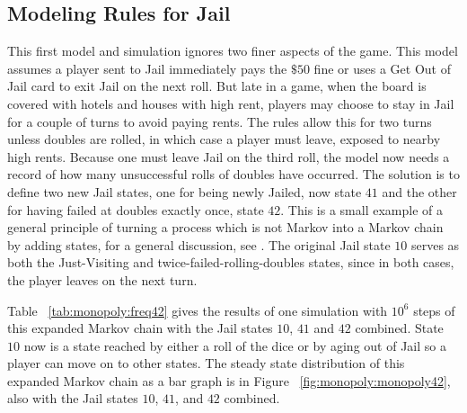 \documentclass[12pt]{article}
\begin{document}
\subsection*{Modeling Rules for Jail}

This first model and simulation ignores two finer aspects of the game.
This model assumes a player sent to Jail immediately pays the \( \$50 \)
fine or uses a Get Out of Jail card to exit Jail on the next roll.  But
late in a game, when the board is covered with hotels and houses with
high rent, players may choose to stay in Jail for a couple of turns to
avoid paying rents.  The rules allow this for two turns unless doubles
are rolled, in which case a player must leave, exposed to nearby high
rents.  Because one must leave Jail on the third roll, the model now
needs a record of how many unsuccessful rolls of doubles have occurred.
The solution is to define two new Jail states, one for being newly
Jailed, now state \( 41 \) and the other for having failed at doubles
exactly once, state \( 42 \).  This is a small example of a general
principle of turning a process which is not Markov into a Markov chain
by adding states, for a general discussion, see
\cite{Stroock2016}. The original Jail state \( 10 \) serves as both the
Just-Visiting and twice-failed-rolling-doubles states, since in both
cases, the player leaves on the next turn.

Table~%
\ref{tab:monopoly:freq42} gives the results of one simulation with \( 10^6
\) steps of this expanded Markov chain with the Jail states \( 10 \), \(
41 \) and \( 42 \) combined.  State \( 10 \) now is a state reached by
either a roll of the dice or by aging out of Jail so a player can move
on to other states. The steady state distribution of this expanded
Markov chain as a bar graph is in Figure~%
\ref{fig:monopoly:monopoly42}, also with the Jail states \( 10 \), \( 41
\), and \( 42 \) combined.
\end{document}
